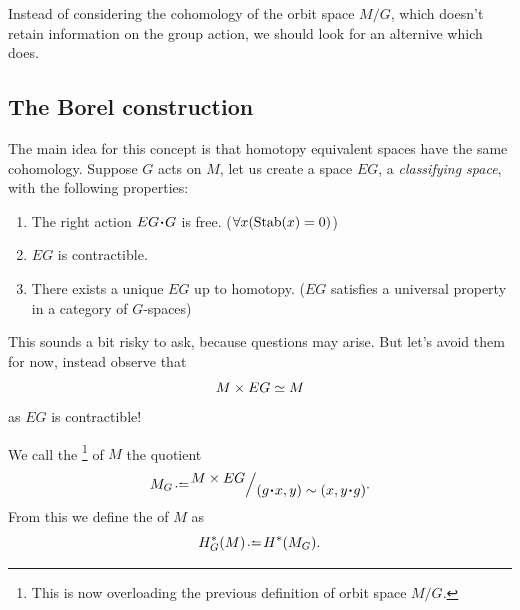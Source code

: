 \documentclass[12pt]{memoir}
\begin{document}
Instead of considering the cohomology of the orbit space $M/G$, which doesn't retain information on the group action, we should look for an alternive which does.

\subsection{The Borel construction}

The main idea for this concept is that homotopy equivalent spaces have the same cohomology. Suppose $G$ acts on $M$, let us create a space $EG$, a \emph{classifying space}, with the following properties:

\begin{enumerate}
    \item The right action $EG\. G$ is free. ($\forall x(\operatorname{Stab}(x)=0)$)
    \item $EG$ is contractible. 
    \item There exists a unique $EG$ up to homotopy. ($EG$ satisfies a universal property in a category of $G$-spaces)
\end{enumerate}

This sounds a bit risky to ask, because questions may arise. But let's avoid them for now, instead observe that 
$$M\times EG\simeq M$$
as $EG$ is contractible! 

\begin{Def}
    We call the \footnote{This is now overloading the previous definition of orbit space $M/G$.} of $M$ the quotient
    $$M_G\defeq\quot{M\x EG}{(g\.x,y)\sim(x,y\.g)}.$$
    From this we define the  of $M$ as 
    $$H_G^\ast(M)\defeq H^\ast(M_G).$$
\end{Def}
\end{document}
